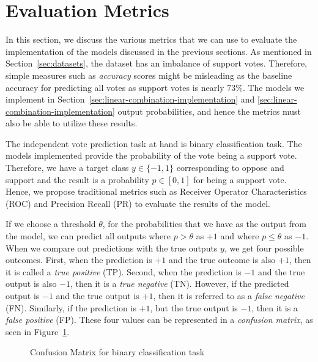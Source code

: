 \section{Evaluation Metrics}
\label{sec:eval-metrics}
In this section, we discuss the various metrics that we can use to evaluate the implementation of the models discussed in the previous sections.
As mentioned in Section~\ref{sec:datasets}, the \wikirfa dataset has an imbalance of support votes.
Therefore, simple measures such as \textit{accuracy} scores might be misleading as the baseline accuracy for predicting all votes as support votes is nearly $73\%$.
The models we implement in Section~\ref{sec:linear-combination-implementation} and \ref{sec:linear-combination-implementation} output probabilities, and hence the metrics must also be able to utilize these results.

The independent vote prediction task at hand is binary classification task.
The models implemented provide the probability of the vote being a support vote.
Therefore, we have a target class $y \in \{-1,1\}$ corresponding to oppose and support and the result is a probability $p \in [0,1]$ for being a support vote.
Hence, we propose traditional metrics such as Receiver Operator Characteristics (ROC) and Precision Recall (PR) to evaluate the results of the model.

If we choose a threshold $\theta$, for the probabilities that we have as the output from the model, we can predict all outputs where $p>\theta$ as $+1$ and where $p \leq \theta$ as $-1$.
When we compare out predictions with the true outputs $y$, we get four possible outcomes.
First, when the prediction is $+1$ and the true outcome is also $+1$, then it is called a \textit{true positive} (TP). Second, when the prediction is $-1$ and the true output is also $-1$, then it is a \textit{true negative} (TN). However, if the predicted output is $-1$ and the true output is $+1$, then it is referred to as a \textit{false negative} (FN). Similarly, if the prediction is $+1$, but the true output is $-1$, then it is a \textit{false positive} (FP). These four values can be represented in a \textit{confusion matrix}, as seen in Figure~\ref{fig:confusion-matrix}.

\begin{figure}[htp]
    \centering
    
    \caption{Confusion Matrix for binary classification task}
    \label{fig:confusion-matrix}
\end{figure}

